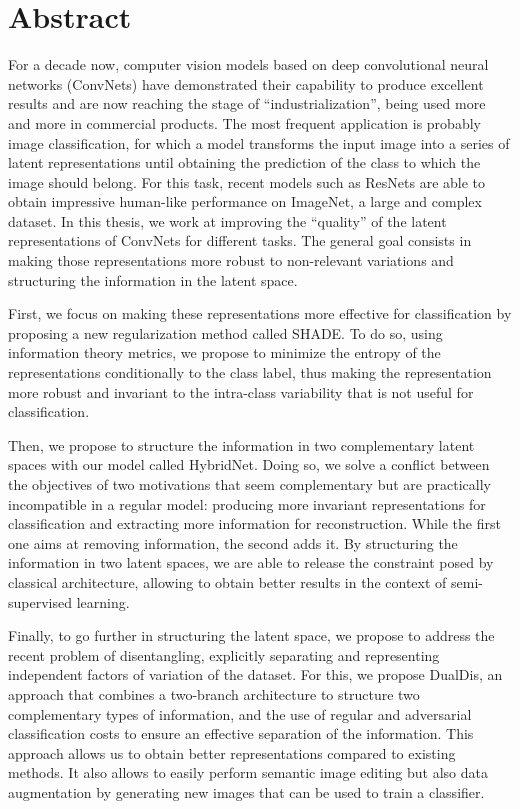 \cleardoublepage
\setcounter{page}{1}

\chapter{Abstract}

For a decade now, computer vision models based on deep convolutional neural networks (ConvNets) have demonstrated their capability to produce excellent results and are now reaching the stage of ``industrialization'', being used more and more in commercial products. The most frequent application is probably image classification, for which a model transforms the input image into a series of latent representations until obtaining the prediction of the class to which the image should belong. For this task, recent models such as ResNets are able to obtain impressive human-like performance on ImageNet, a large and complex dataset.
%
In this thesis, we work at improving the ``quality'' of the latent representations of ConvNets for different tasks. The general goal consists in making those representations more robust to non-relevant variations and structuring the information in the latent space.

First, we focus on making these representations more effective for classification by proposing a new regularization method called SHADE. To do so, using information theory metrics, we propose to minimize the entropy of the representations conditionally to the class label, thus making the representation more robust and invariant to the intra-class variability that is not useful for classification.

Then, we propose to structure the information in two complementary latent spaces with our model called HybridNet. Doing so, we solve a conflict between the objectives of two motivations that seem complementary but are practically incompatible in a regular model: producing more invariant representations for classification and extracting more information for reconstruction. While the first one aims at removing information, the second adds it. By structuring the information in two latent spaces, we are able to release the constraint posed by classical architecture, allowing to obtain better results in the context of semi-supervised learning.

Finally, to go further in structuring the latent space, we propose to address the recent problem of disentangling, \ie explicitly separating and representing independent factors of variation of the dataset. For this, we propose DualDis, an approach that combines a two-branch architecture to structure two complementary types of information, and the use of regular and adversarial classification costs to ensure an effective separation of the information. This approach allows us to obtain better representations compared to existing methods. It also allows to easily perform semantic image editing but also data augmentation by generating new images that can be used to train a classifier.

